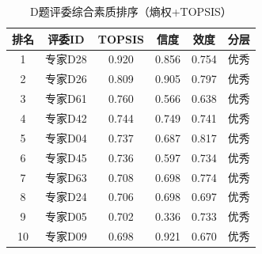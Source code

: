 \begin{table}[h]
\centering
\caption{D题评委综合素质排序（熵权+TOPSIS）}
\begin{tabular}{cccccc}
\hline
排名 & 评委ID & TOPSIS & 信度 & 效度 & 分层 \\
\hline
1 & 专家D28 & 0.920 & 0.856 & 0.754 & 优秀 \\
2 & 专家D26 & 0.809 & 0.905 & 0.797 & 优秀 \\
3 & 专家D61 & 0.760 & 0.566 & 0.638 & 优秀 \\
4 & 专家D42 & 0.744 & 0.749 & 0.741 & 优秀 \\
5 & 专家D04 & 0.737 & 0.687 & 0.817 & 优秀 \\
6 & 专家D45 & 0.736 & 0.597 & 0.734 & 优秀 \\
7 & 专家D63 & 0.708 & 0.698 & 0.774 & 优秀 \\
8 & 专家D24 & 0.706 & 0.698 & 0.697 & 优秀 \\
9 & 专家D05 & 0.702 & 0.336 & 0.733 & 优秀 \\
10 & 专家D09 & 0.698 & 0.921 & 0.670 & 优秀 \\
\hline
\end{tabular}
\end{table}
